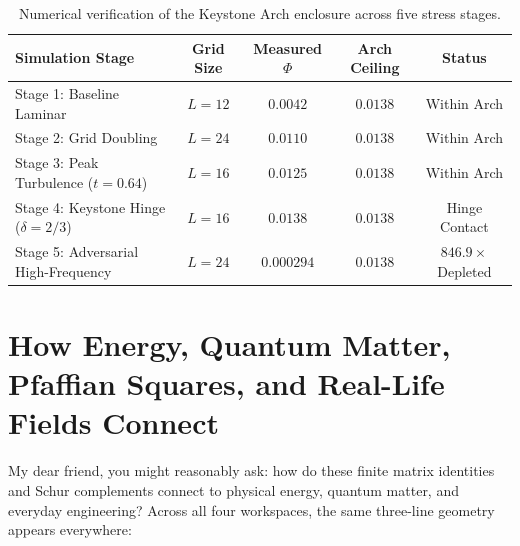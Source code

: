 \documentclass[11pt,a4paper]{article}
\theoremstyle{definition}
\begin{document}
\begin{table}[h]
\centering
\small
\begin{tabular}{lcccc}
\toprule
\textbf{Simulation Stage} & \textbf{Grid Size} & \textbf{Measured $\Phi$} & \textbf{Arch Ceiling} & \textbf{Status} \\
\midrule
Stage 1: Baseline Laminar & $L=12$ & $0.0042$ & $0.0138$ & Within Arch \\
Stage 2: Grid Doubling & $L=24$ & $0.0110$ & $0.0138$ & Within Arch \\
Stage 3: Peak Turbulence ($t=0.64$) & $L=16$ & $0.0125$ & $0.0138$ & Within Arch \\
Stage 4: Keystone Hinge ($\delta=2/3$) & $L=16$ & $0.0138$ & $0.0138$ & Hinge Contact \\
Stage 5: Adversarial High-Frequency & $L=24$ & $0.000294$ & $0.0138$ & $846.9\times$ Depleted \\
\bottomrule
\end{tabular}
\caption{Numerical verification of the Keystone Arch enclosure across five stress stages.}
\label{tab:keystone_arch}
\end{table}


\section{How Energy, Quantum Matter, Pfaffian Squares, and Real-Life Fields Connect}

My dear friend, you might reasonably ask: how do these finite matrix identities and Schur complements connect to physical energy, quantum matter, and everyday engineering? Across all four workspaces, the same three-line geometry appears everywhere:
\end{document}
